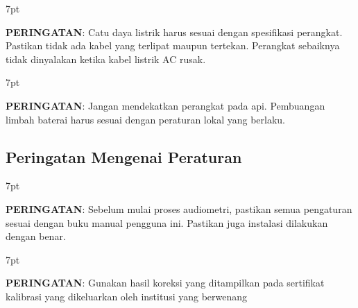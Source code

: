 \documentclass[11pt,a4paper,twoside,onecolumn]{book}
\newenvironment{formalred}{%
	\def\FrameCommand{%
		\hspace{1pt}%
		{\color{red}\vrule width 2pt}%
		{\color{formalshade}\vrule width 4pt}%
		\colorbox{formalshade}%
	}%
	\MakeFramed{\advance\hsize-\width\FrameRestore}%
	\noindent\hspace{-4.55pt}%
	\begin{adjustwidth}{}{7pt}%
		\vspace{2pt}\vspace{2pt}%
	}
	{%
		\vspace{2pt}\end{adjustwidth}\endMakeFramed%
}
\begin{document}
				\begin{formalred}
					\raisebox{0.125ex}{\resizebox{!}{2ex}{\danger}} \textbf{PERINGATAN}: 
					Catu daya listrik harus sesuai dengan spesifikasi perangkat. Pastikan tidak ada kabel yang terlipat maupun tertekan. Perangkat sebaiknya tidak dinyalakan ketika kabel listrik AC rusak. 
				\end{formalred}
				
				\begin{formalred}
					\raisebox{0.125ex}{\resizebox{!}{2ex}{\danger}} \textbf{PERINGATAN}: 
					Jangan mendekatkan perangkat pada api. Pembuangan limbah baterai harus sesuai dengan peraturan lokal yang berlaku.
				\end{formalred}
			
			\subsection{Peringatan Mengenai Peraturan}
				\begin{formalred}
					\raisebox{0.125ex}{\resizebox{!}{2ex}{\danger}} \textbf{PERINGATAN}: 
					Sebelum mulai proses audiometri, pastikan semua pengaturan sesuai dengan buku manual pengguna ini. Pastikan juga instalasi dilakukan dengan benar.
				\end{formalred}
				
				\begin{formalred}
					\raisebox{0.125ex}{\resizebox{!}{2ex}{\danger}} \textbf{PERINGATAN}: 
					Gunakan hasil koreksi yang ditampilkan pada sertifikat kalibrasi yang dikeluarkan oleh institusi yang berwenang
				\end{formalred}	
			
\end{document}
